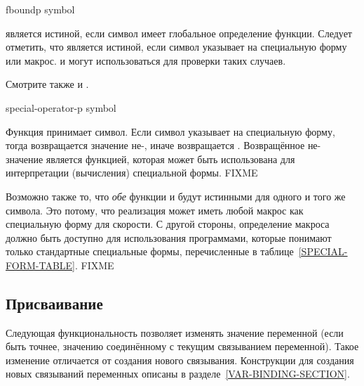 \begin{defun}[Function]
fboundp symbol

 является истиной, если символ имеет глобальное определение
функции.
Следует отметить, что  является истиной, если символ указывает на
специальную форму или макрос.  и  могут
использоваться для проверки таких случаев.

Смотрите также  и .
\end{defun}

\begin{defun}[Function]
special-operator-p symbol

Функция  принимает символ. Если символ указывает на
специальную форму, тогда возвращается значение не-{\false}, иначе возвращается {\false}.
Возвращённое не-{\nil} значение является функцией,
которая может быть использована для интерпретации (вычисления) специальной
формы. FIXME

Возможно также то, что \emph{обе} функции  и
 будут истинными для одного и того же символа. Это потому,
что реализация может иметь любой макрос как специальную форму для скорости.
С другой стороны, определение макроса должно быть доступно для использования
программами, которые понимают только стандартные специальные формы,
перечисленные в таблице~\ref{SPECIAL-FORM-TABLE}. FIXME
\end{defun}

\subsection{Присваивание}

Следующая функциональность позволяет изменять значение переменной (если быть
точнее, значению соединённому с текущим связыванием переменной).
Такое изменение отличается от создания нового связывания.
Конструкции для создания новых связываний переменных описаны в
разделе~\ref{VAR-BINDING-SECTION}.

